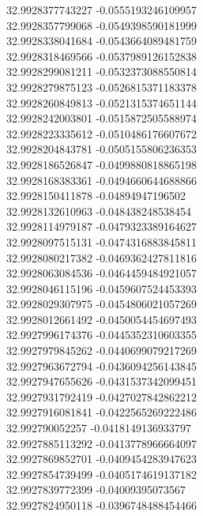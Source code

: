 {32.9928377743227	-0.0555193246109957\\
32.9928357799068	-0.0549398590181999\\
32.9928338041684	-0.0543664089481759\\
32.9928318469566	-0.0537989126152838\\
32.9928299081211	-0.0532373088550814\\
32.9928279875123	-0.0526815371183378\\
32.9928260849813	-0.0521315374651144\\
32.9928242003801	-0.0515872505588974\\
32.9928223335612	-0.0510486176607672\\
32.9928204843781	-0.0505155806236353\\
32.9928186526847	-0.0499880818865198\\
32.9928168383361	-0.0494660644688866\\
32.9928150411878	-0.04894947196502\\
32.9928132610963	-0.048438248538454\\
32.9928114979187	-0.0479323389164627\\
32.9928097515131	-0.0474316883845811\\
32.9928080217382	-0.0469362427811816\\
32.9928063084536	-0.0464459484921057\\
32.9928046115196	-0.0459607524453393\\
32.9928029307975	-0.0454806021057269\\
32.9928012661492	-0.0450054454697493\\
32.9927996174376	-0.0445352310603355\\
32.9927979845262	-0.0440699079217269\\
32.9927963672794	-0.0436094256143845\\
32.9927947655626	-0.0431537342099451\\
32.9927931792419	-0.0427027842862212\\
32.9927916081841	-0.0422565269222486\\
32.992790052257	-0.0418149136933797\\
32.9927885113292	-0.0413778966664097\\
32.9927869852701	-0.0409454283947623\\
32.9927854739499	-0.0405174619137182\\
32.9927839772399	-0.04009395073567\\
32.9927824950118	-0.0396748488454466\\
}

